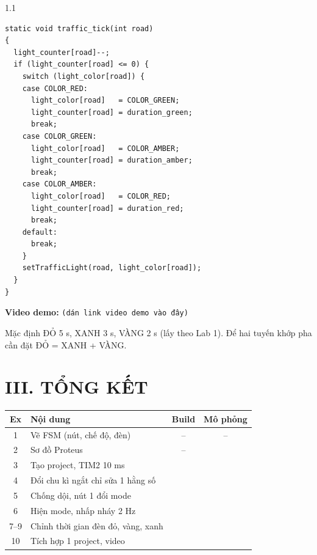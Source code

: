 \documentclass[a4paper,12pt]{article}
\newcommand{\videolink}{(dán link video demo vào đây)}   %
\newcommand{\cmark}{\ding{51}}
\begin{document}
\begin{spacing}{1.1}
\begin{lstlisting}[caption={Exercise 10 -- FSM den giao thong}]
static void traffic_tick(int road)
{
  light_counter[road]--;
  if (light_counter[road] <= 0) {
    switch (light_color[road]) {
    case COLOR_RED:
      light_color[road]   = COLOR_GREEN;
      light_counter[road] = duration_green;
      break;
    case COLOR_GREEN:
      light_color[road]   = COLOR_AMBER;
      light_counter[road] = duration_amber;
      break;
    case COLOR_AMBER:
      light_color[road]   = COLOR_RED;
      light_counter[road] = duration_red;
      break;
    default:
      break;
    }
    setTrafficLight(road, light_color[road]);
  }
}
\end{lstlisting}

\begin{ghichu}
\textbf{Video demo:} \texttt{\small \videolink}

Mặc định ĐỎ 5 s, XANH 3 s, VÀNG 2 s (lấy theo Lab 1). Để hai tuyến khớp pha cần đặt ĐỎ = XANH + VÀNG.
\end{ghichu}

\clearpage
\section*{\centering III. TỔNG KẾT}

\renewcommand{\arraystretch}{1.15}
\begin{center}
\small
\begin{tabularx}{\textwidth}{|c|X|c|c|}
\hline
\textbf{Ex} & \textbf{Nội dung} & \textbf{Build} & \textbf{Mô phỏng} \\\hline
1  & Vẽ FSM (nút, chế độ, đèn)              & -- & -- \\\hline
2  & Sơ đồ Proteus                          & -- & \cmark \\\hline
3  & Tạo project, TIM2 10 ms                & \cmark & \cmark \\\hline
4  & Đổi chu kì ngắt chỉ sửa 1 hằng số      & \cmark & \cmark \\\hline
5  & Chống dội, nút 1 đổi mode              & \cmark & \cmark \\\hline
6  & Hiện mode, nhấp nháy 2 Hz              & \cmark & \cmark \\\hline
7--9 & Chỉnh thời gian đèn đỏ, vàng, xanh   & \cmark & \cmark \\\hline
10 & Tích hợp 1 project, video              & \cmark & \cmark \\\hline
\end{tabularx}
\end{center}
\renewcommand{\arraystretch}{1.0}


\end{spacing}
\end{document}
